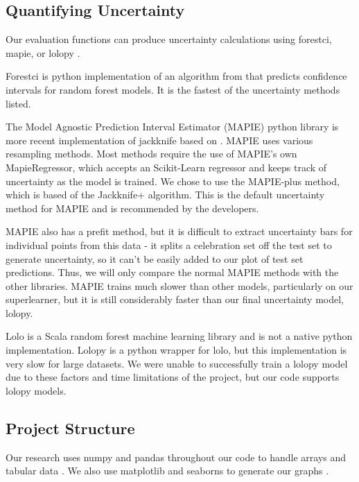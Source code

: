 \documentclass[twocolumn, nofootinbib, secnumarabic, amssymb, nobibnotes, aps, prd]{revtex4-2}
\begin{document}
\subsection{Quantifying Uncertainty}\label{sec:uncertainty}
Our evaluation functions can produce uncertainty calculations using forestci, mapie, or lolopy \cite{Polimis2017, Taquet2022, Hutchinson2022}. 

Forestci is python implementation of an algorithm from \cite{Wager2014} that predicts confidence intervals for random forest models. It is the fastest of the uncertainty methods listed. 

The Model Agnostic Prediction Interval Estimator (MAPIE) python library is more recent implementation of jackknife based on \cite{Foygel2020}. MAPIE uses various resampling methods. Most methods require the use of MAPIE's own MapieRegressor, which accepts an Scikit-Learn regressor and keeps track of uncertainty as the model is trained. We chose to use the MAPIE-plus method, which is based of the Jackknife+ algorithm. This is the default uncertainty method for MAPIE and is recommended by the developers.

MAPIE also has a prefit method, but it is difficult to extract uncertainty bars for individual points from this data - it splits a celebration set off the test set to generate uncertainty, so it can't be easily added to our plot of test set predictions. Thus, we will only compare the normal MAPIE methods with the other libraries. MAPIE trains much slower than other models, particularly on our superlearner, but it is still considerably faster than our final uncertainty model, lolopy.

Lolo is a Scala random forest machine learning library and is not a native python implementation. Lolopy is a python wrapper for lolo, but this implementation is very slow for large datasets. We were unable to successfully train a lolopy model due to these factors and time limitations of the project, but our code supports lolopy models.

\subsection{Project Structure} %

Our research uses numpy and pandas throughout our code to handle arrays and tabular data \cite{Harris2020array, Reback2020pandas}. We also use matplotlib and seaborns to generate our graphs \cite{Hunter2007, Waskom2021}.
\end{document}
